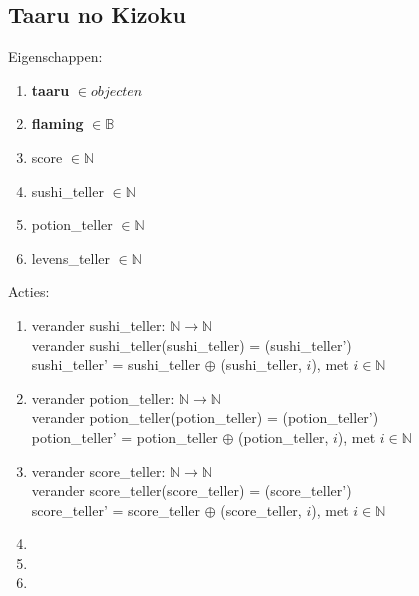 
\subsection{Taaru no Kizoku}\label{sub:taaru_no_kizoku} %
Eigenschappen:
\begin{enumerate}
    \item \textbf{taaru} $\in objecten $
    \item \textbf{flaming} $\in \mathbb{B}$
    \item score $\in \mathbb{N}$
    \item sushi\_teller $\in \mathbb{N}$
    \item potion\_teller $\in \mathbb{N}$
    \item levens\_teller $\in \mathbb{N}$
\end{enumerate}
Acties:
\begin{enumerate}
    \item verander sushi\_teller: $\mathbb{N} \rightarrow \mathbb{N}$ \\
 verander sushi\_teller(sushi\_teller) = (sushi\_teller') \\
 sushi\_teller' = sushi\_teller $\oplus$ (sushi\_teller, $i$), met $i \in \mathbb{N}$ \\
    \item verander potion\_teller: $\mathbb{N} \rightarrow \mathbb{N}$ \\
verander potion\_teller(potion\_teller) = (potion\_teller') \\
potion\_teller' = potion\_teller $\oplus$ (potion\_teller, $i$), met $i \in \mathbb{N}$ \\
    \item verander score\_teller: $\mathbb{N} \rightarrow \mathbb{N}$ \\
verander score\_teller(score\_teller) = (score\_teller') \\
score\_teller' = score\_teller $\oplus$ (score\_teller, $i$), met $i \in \mathbb{N}$ \\
    \item
    \item
    \item

\end{enumerate}




